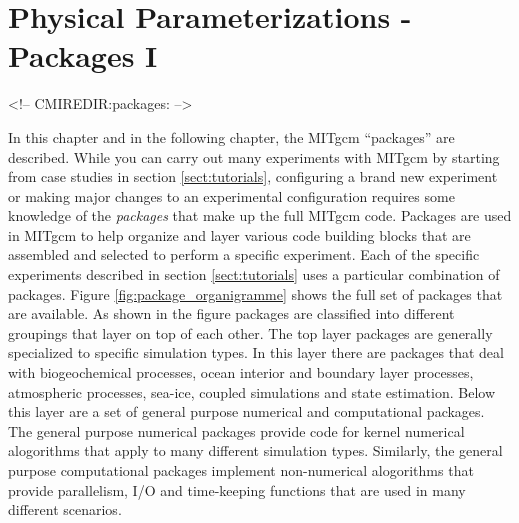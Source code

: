 
\chapter{Physical Parameterizations - Packages I}
\begin{rawhtml}
<!-- CMIREDIR:packages: -->
\end{rawhtml}

In this chapter and in the following chapter, the MITgcm ``packages'' are 
described. While you can carry out many experiments with MITgcm by starting 
from case studies in section \ref{sect:tutorials}, configuring
a brand new experiment or making major changes to an experimental configuration
requires some knowledge of the {\it packages}
that make up the full MITgcm code. Packages are used in MITgcm to
help organize and layer various code building blocks that are assembled 
and selected to perform a specific experiment. Each of the specific experiments
described in section \ref{sect:tutorials} uses a particular combination
of packages.
Figure \ref{fig:package_organigramme} shows the full set of packages that
are available. As shown in the figure packages are classified into different 
groupings that layer on top of each other. The top layer packages are 
generally specialized to specific simulation types. In this layer there are
packages that deal with biogeochemical processes, ocean interior
and boundary layer processes, atmospheric processes, sea-ice, coupled 
simulations and state estimation.
Below this layer are a set of general purpose
numerical and computational packages. The general purpose numerical packages
provide code for kernel numerical alogorithms
that apply to
many different simulation types. Similarly, the general purpose computational 
packages implement non-numerical alogorithms that provide parallelism,
I/O and time-keeping functions that are used in many different scenarios.


